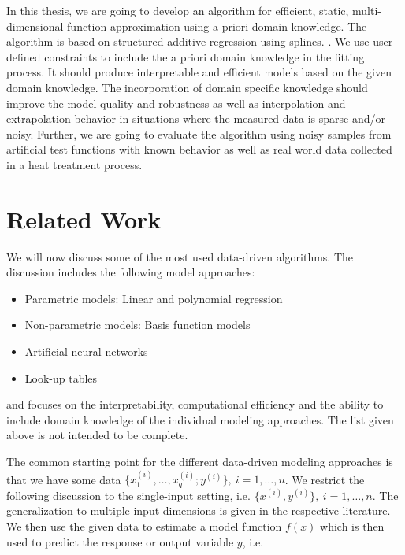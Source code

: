 \documentclass[10pt,a4paper]{article}
\begin{document}
In this thesis, we are going to develop an algorithm for efficient, static, multi-dimensional function approximation using a priori domain knowledge. The algorithm is based on structured additive regression using splines. \cite{fahrmeir2013regression}. We use user-defined constraints to include the a priori domain knowledge in the fitting process. \cite{hofner2011monotonicity} It should produce interpretable and efficient models based on the given domain knowledge. The incorporation of domain specific knowledge should improve the model quality and robustness as well as interpolation and extrapolation behavior in situations where the measured data is sparse and/or noisy. Further, we are going to evaluate the algorithm using noisy samples from artificial test functions with known behavior as well as real world data collected in a heat treatment process. 
\section{Related Work}

We will now discuss some of the most used data-driven algorithms. The discussion includes the following model approaches:

\begin{itemize}
	\item Parametric models: Linear and polynomial regression
	\item Non-parametric models: Basis function models
	\item Artificial neural networks
	\item Look-up tables
\end{itemize}

and focuses on the interpretability, computational efficiency and the ability to include domain knowledge of the individual modeling approaches. The list given above is not intended to be complete. 

The common starting point for the different data-driven modeling approaches is that we have some data $\{x_1^{(i)}, \dots, x_q^{(i)}; y^{(i)} \}, \ i = 1, \dots, n$. We restrict the following discussion to the single-input setting, i.e. $\{x^{(i)}, y^{(i)}\}, \ i=1, \dots, n$. The generalization to multiple input dimensions is given in the respective literature. We then use the given data to estimate a model function $f(x)$  which is then used to predict the response or output variable $y$, i.e.
\end{document}
